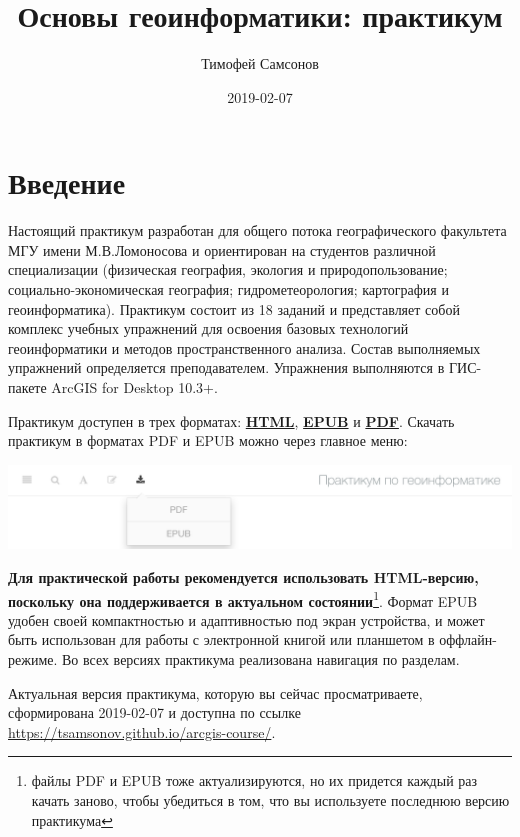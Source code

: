 \documentclass[12pt,]{book}
\title{Основы геоинформатики: практикум}
\author{Тимофей Самсонов}
\date{2019-02-07}
\let\rmarkdownfootnote\footnote%
\def\footnote{\protect\rmarkdownfootnote}
\begin{document}
\maketitle

{
\hypersetup{linkcolor=black}
\setcounter{tocdepth}{1}
\tableofcontents
}
\hypertarget{section}{%
\chapter*{Введение}\label{section}}

Настоящий практикум разработан для общего потока географического факультета МГУ имени М.В.Ломоносова и ориентирован на студентов различной специализации (физическая география, экология и природопользование; социально-экономическая география; гидрометеорология; картография и геоинформатика). Практикум состоит из 18 заданий и представляет собой комплекс учебных упражнений для освоения базовых технологий геоинформатики и методов пространственного анализа. Состав выполняемых упражнений определяется преподавателем. Упражнения выполняются в ГИС-пакете ArcGIS for Desktop 10.3+.

Практикум доступен в трех форматах: \href{https://tsamsonov.github.io/arcgis-course/}{\textbf{HTML}}, \href{https://tsamsonov.github.io/arcgis-course/arcgis-course.epub}{\textbf{EPUB}} и \href{https://tsamsonov.github.io/arcgis-course/arcgis-course.pdf}{\textbf{PDF}}. Скачать практикум в форматах PDF и EPUB можно через главное меню:

\includegraphics{images/download.png}

\textbf{Для практической работы рекомендуется использовать HTML-версию, поскольку она поддерживается в актуальном состоянии}\footnote{файлы PDF и EPUB тоже актуализируются, но их придется каждый раз качать заново, чтобы убедиться в том, что вы используете последнюю версию практикума}. Формат EPUB удобен своей компактностью и адаптивностью под экран устройства, и может быть использован для работы с электронной книгой или планшетом в оффлайн-режиме. Во всех версиях практикума реализована навигация по разделам.

Актуальная версия практикума, которую вы сейчас просматриваете, сформирована 2019-02-07 и доступна по ссылке \url{https://tsamsonov.github.io/arcgis-course/}.
\end{document}
